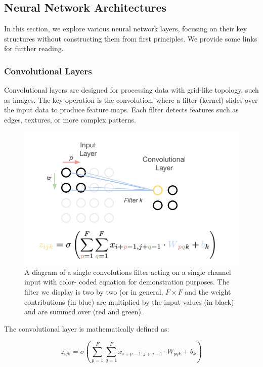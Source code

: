 \subsection{Neural Network Architectures}

In this section, we explore various neural network layers, focusing on their key structures without constructing them from first principles. We provide some links for further reading.

\subsubsection{Convolutional Layers}

Convolutional layers are designed for processing data with grid-like topology, such as images. The key operation is the convolution, where a filter (kernel) slides over the input data to produce feature maps. Each filter detects features such as edges, textures, or more complex patterns.

\begin{figure}[h]
    \centering
    \includegraphics[width=1\textwidth]{img/4_conv.png}
    \caption{A diagram of a single convolutions filter acting on a single channel input with color- coded equation for demonstration purposes. The filter we display is two by two (or in general, $F \times F$ and the weight contributions (in blue) are multiplied by the input values (in black) and are summed over (red and green).
    }
\end{figure}

The convolutional layer is mathematically defined as:

\[
    z_{ijk} = \sigma \left( \sum_{p=1}^{F} \sum_{q=1}^{F} x_{i+p-1, j+q-1} \cdot W_{pqk} + b_k \right)
\]

